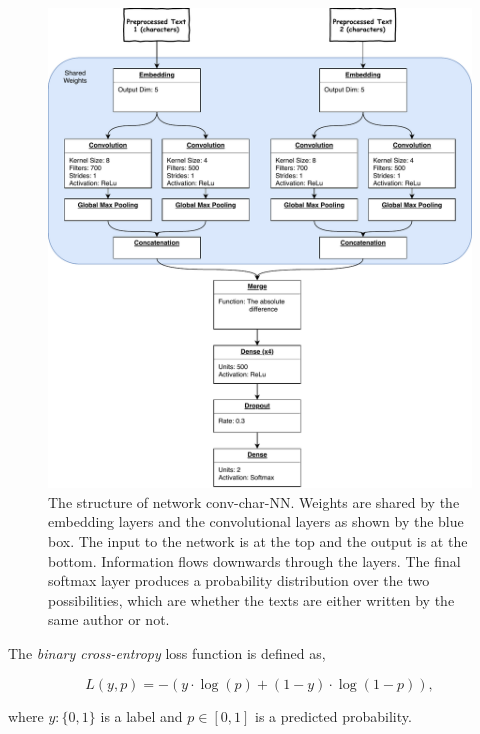\begin{figure}
    \centering
    \includegraphics[width=\textwidth]{./pictures/experiments/conv_char_nn/model}
    \caption{The structure of network \gls{conv-char-NN}. Weights are shared
    by the embedding layers and the convolutional layers as shown by the blue
    box. The input to the network is at the top and the output is at the bottom.
    Information flows downwards through the layers. The final softmax layer
    produces a probability distribution over the two possibilities, which are
    whether the texts are either written by the same author or not.}
    \label{fig:conv-char-NN}
\end{figure}

\begin{lemma}

    The \textit{binary cross-entropy} loss function is defined as,

    \begin{equation}\label{eq:binary_ce}
        L(y, p) = -(y \cdot \log(p) + (1- y)\cdot\log(1 - p)),
    \end{equation}

    where $y : \{0,1\}$ is a label and $p \in [0,1]$ is a predicted probability.

\end{lemma}

